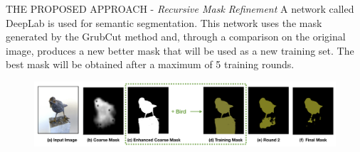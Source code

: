 \begin{frame}{THE PROPOSED APPROACH - \emph{Recursive Mask Refinement}}
    A network called DeepLab  is used for semantic segmentation. This 
    network uses the mask generated by the GrubCut method and, through a 
    comparison on the original image, produces a new better mask that will 
    be used as a new training set. The best mask will be obtained after a 
    maximum of 5 training rounds.
    \begin{figure}[h!]
        \centering
        \includegraphics[width = 1 \linewidth]{images/paper6/DeepLab.png}
        \centering
    \end{figure}
\end{frame}




